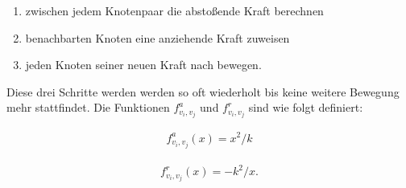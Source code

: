 \begin{enumerate}
	\item zwischen jedem Knotenpaar die abstoßende Kraft berechnen
	\item benachbarten Knoten eine anziehende Kraft zuweisen
	\item jeden Knoten seiner neuen Kraft nach bewegen.
\end{enumerate} 
Diese drei Schritte werden werden so oft wiederholt bis keine weitere Bewegung mehr stattfindet.
Die Funktionen \begin{math} f^{a}_{v_{i},v_{j}} \end{math} und \begin{math} f^{r}_{v_{i},v_{j}} \end{math} sind wie folgt definiert:


\begin{align}
	f^{a}_{v_{i},v_{j}} (x) =
	x^{2}/k
\end{align}

\begin{align}
	f^{r}_{v_{i},v_{j}} (x) =
	-k^{2}/x.
\end{align}


